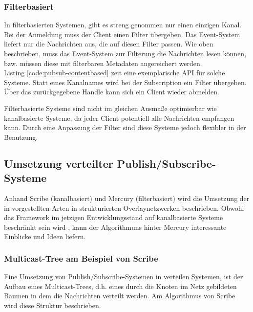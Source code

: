 \subsubsection{Filterbasiert}
\label{chap:grundlagen:pubsub:filterbased}
In filterbasierten Systemen, gibt es streng genommen nur einen einzigen Kanal. Bei der Anmeldung muss der Client einen Filter übergeben. Das Event-System liefert nur die Nachrichten aus, die auf diesen Filter passen. Wie oben beschrieben, muss das Event-System zur Filterung die Nachrichten lesen können, bzw. müssen diese mit filterbaren Metadaten angereichert werden.\\
Listing \ref{code:pubsub-contentbased} zeit eine exemplarische API für solche Systeme. Statt eines Kanalnames wird bei der Subscription ein Filter übergeben. Über das zurückgegebene Handle kann sich ein Client wieder abmelden.

Filterbasierte Systeme sind nicht im gleichen Ausmaße optimierbar wie kanalbasierte Systeme, da jeder Client potentiell alle Nachrichten empfangen kann. Durch eine Anpassung der Filter sind diese Systeme jedoch flexibler in der Benutzung.




\subsection{Umsetzung verteilter Publish/Subscribe-Systeme}
Anhand Scribe (kanalbasiert) \cite{Castro2002Scribe} und Mercury (filterbasiert) \cite{Bharambe2004Mercury} wird die Umsetzung der in  vorgestellten Arten in strukturierten Overlaynetzwerken beschrieben. Obwohl das Framework im jetzigen Entwicklungsstand auf kanalbasierte Systeme beschränkt sein wird , kann der Algorithmuns hinter Mercury interessante Einblicke und Ideen liefern.

\subsubsection*{Multicast-Tree am Beispiel von Scribe}
\label{chap:related:scribe}
Eine Umsetzung von Publish/Subscribe-Systemen in verteilen Systemen, ist der Aufbau eines Multicast-Trees, d.h. eines durch die Knoten im Netz gebildeten Baumen in dem die Nachrichten verteilt werden. Am Algorithmus von Scribe wird diese Struktur beschrieben.

